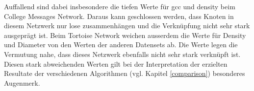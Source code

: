 Auffallend sind dabei insbesondere die tiefen Werte für \acs{gcc} und \acs{density} beim College Messages Network.
Daraus kann geschlossen werden, dass Knoten in diesem Netzwerk nur lose zusammenhängen und die Verknüpfung nicht sehr stark ausgeprägt ist.
Beim Tortoise Network weichen ausserdem die Werte für Density und Diameter von den Werten der anderen Datensets ab.
Die Werte legen die Vermutung nahe, dass dieses Netzwerk ebenfalls nicht sehr stark verknüpft ist.
Diesen stark abweichenden Werten gilt bei der Interpretation der erzielten Resultate der verschiedenen Algorithmen (vgl. Kapitel \ref{comparison}) besonderes Augenmerk.
